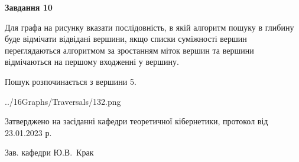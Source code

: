 \documentclass[12pt, ukrainian]{article}
\begin{document}
{\begin {large}
{\begin {center}\textbf{Завдання 10}\end {center}}\par
Для графа на рисунку вказати послідовність, в якій алгоритм пошуку в глибину буде відмічати відвідані вершини, якщо списки суміжності вершин переглядаються алгоритмом за зростанням міток вершин та вершини відмічаються на першому вход\-женні у вершину.\par
Пошук розпочинається з вершини 5.\par

\begin{center}
	{../16Graphs/Traversals/132.png}
\end{center}\par
\newpage


\end {large}
}
{\smallskip \begin {small} Затверджено на засіданні кафедри теоретичної кібернетики, протокол  від   23.01.2023 р.\par\smallskip\smallskip
{\parbox {6.5 cm}{Зав. кафедри \dotfill Ю.В.~Крак}} \end{small}}
\end{document}
